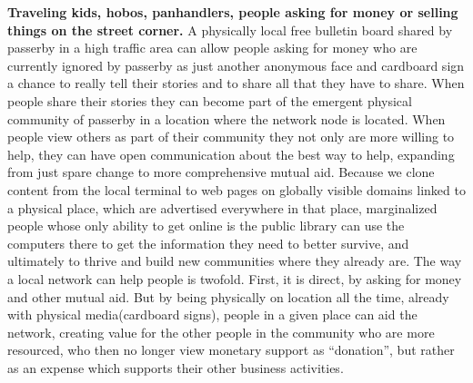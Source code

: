 \textbf{Traveling kids, hobos, panhandlers, people asking for money or
selling things on the street corner.} A physically local free bulletin
board shared by passerby in a high traffic area can allow people asking
for money who are currently ignored by passerby as just another
anonymous face and cardboard sign a chance to really tell their stories
and to share all that they have to share. When people share their
stories they can become part of the emergent physical community of
passerby in a location where the network node is located. When people
view others as part of their community they not only are more willing to
help, they can have open communication about the best way to help,
expanding from just spare change to more comprehensive mutual aid.
Because we clone content from the local terminal to web pages on
globally visible domains linked to a physical place, which are
advertised everywhere in that place, marginalized people whose only
ability to get online is the public library can use the computers there
to get the information they need to better survive, and ultimately to
thrive and build new communities where they already are. The way a local
network can help people is twofold. First, it is direct, by asking for
money and other mutual aid. But by being physically on location all the
time, already with physical media(cardboard signs), people in a given
place can aid the network, creating value for the other people in the
community who are more resourced, who then no longer view monetary
support as ``donation'', but rather as an expense which supports their
other business activities.

